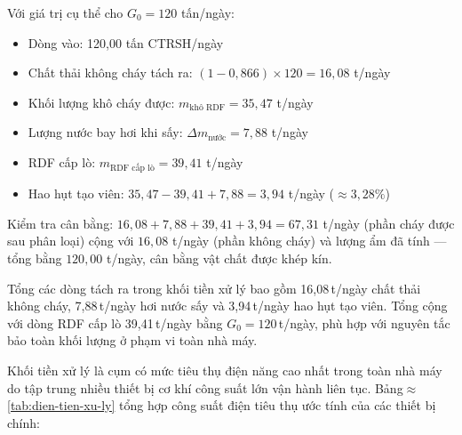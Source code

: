 \documentclass[../main.tex]{subfiles}
\begin{document}
Với giá trị cụ thể cho $G_0 = 120$ tấn/ngày:
\begin{itemize}
  \item Dòng vào: 120,00 tấn CTRSH/ngày
  \item Chất thải không cháy tách ra: $(1 - 0{,}866) \times 120 = 16{,}08$ t/ngày
  \item Khối lượng khô cháy được: $m_{\text{khô RDF}} = 35{,}47$ t/ngày
  \item Lượng nước bay hơi khi sấy: $\Delta m_{\text{nước}} = 7{,}88$ t/ngày
  \item RDF cấp lò: $m_{\text{RDF cấp lò}} = 39{,}41$ t/ngày
  \item Hao hụt tạo viên: $35{,}47 - 39{,}41 + 7{,}88 = 3{,}94$ t/ngày ($\approx 3{,}28\%$)
\end{itemize}

Kiểm tra cân bằng: $16{,}08 + 7{,}88 + 39{,}41 + 3{,}94 = 67{,}31$ t/ngày (phần cháy được sau phân loại) cộng với $16{,}08$ t/ngày (phần không cháy) và lượng ẩm đã tính --- tổng bằng $120{,}00$ t/ngày, cân bằng vật chất được khép kín.

Tổng các dòng tách ra trong khối tiền xử lý bao gồm 16,08\,t/ngày chất thải không cháy, 7,88\,t/ngày hơi nước sấy và 3,94\,t/ngày hao hụt tạo viên. Tổng cộng với dòng RDF cấp lò 39,41\,t/ngày bằng $G_0 = 120$\,t/ngày, phù hợp với nguyên tắc bảo toàn khối lượng ở phạm vi toàn nhà máy.

Khối tiền xử lý là cụm có mức tiêu thụ điện năng cao nhất trong toàn nhà máy do tập trung nhiều thiết bị cơ khí công suất lớn vận hành liên tục. Bảng$\approx$\ref{tab:dien-tien-xu-ly} tổng hợp công suất điện tiêu thụ ước tính của các thiết bị chính:
\end{document}

